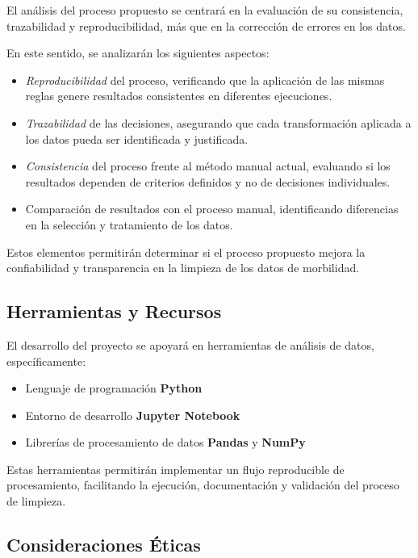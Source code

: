 \documentclass[12pt, letterpaper, oneside]{article}
\begin{document}
El análisis del proceso propuesto se centrará en la evaluación de su consistencia, trazabilidad y reproducibilidad, más que en la corrección de errores en los datos.

En este sentido, se analizarán los siguientes aspectos:

\begin{itemize}
\item \textit{Reproducibilidad} del proceso, verificando que la aplicación de las mismas reglas genere resultados consistentes en diferentes ejecuciones.
\item \textit{Trazabilidad} de las decisiones, asegurando que cada transformación aplicada a los datos pueda ser identificada y justificada.
\item \textit{Consistencia} del proceso frente al método manual actual, evaluando si los resultados dependen de criterios definidos y no de decisiones individuales.
\item Comparación de resultados con el proceso manual, identificando diferencias en la selección y tratamiento de los datos.
\end{itemize}

Estos elementos permitirán determinar si el proceso propuesto mejora la confiabilidad y transparencia en la limpieza de los datos de morbilidad.

\subsection{Herramientas y Recursos}

El desarrollo del proyecto se apoyará en herramientas de análisis de datos, específicamente:

\begin{itemize}
\item Lenguaje de programación \textbf{Python}
\item Entorno de desarrollo \textbf{Jupyter Notebook}
\item Librerías de procesamiento de datos \textbf{Pandas} y \textbf{NumPy}
\end{itemize}

Estas herramientas permitirán implementar un flujo reproducible de procesamiento, facilitando la ejecución, documentación y validación del proceso de limpieza.

\subsection{Consideraciones Éticas}
\end{document}
